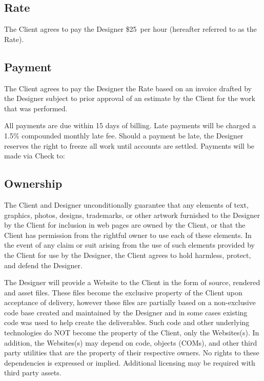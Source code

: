 \documentclass[a4paper,12pt]{article} %
\newcommand{\HourlyRate}{\$25}
\begin{document}
\subsection{Rate}

The Client agrees to pay the Designer \HourlyRate~per hour (hereafter referred to as the Rate).


\subsection{Payment}

The Client agrees to pay the Designer the Rate based on an invoice drafted by the Designer subject to prior approval of an estimate by the Client for the work that was performed.

All payments are due within 15 days of billing. Late payments will be charged a 1.5\% compounded monthly late fee. Should a payment be late, the Designer reserves the right to freeze all work until accounts are settled. Payments will be made via Check to:


\subsection{Ownership}

The Client and Designer unconditionally guarantee that any elements of text, graphics, photos, designs, trademarks, or other artwork furnished to the Designer by the Client for inclusion in web pages are owned by the Client, or that the Client has permission from the rightful owner to use each of these elements. In the event of any claim or suit arising from the use of such elements provided by the Client for use by the Designer, the Client agrees to hold harmless, protect, and defend the Designer.

The Designer will provide a Website to the Client in the form of source, rendered and asset files. These files become the exclusive property of the Client upon acceptance of delivery, however these files are partially based on a non-exclusive code base created and maintained by the Designer and in some cases existing code was used to help create the deliverables. Such code and other underlying technologies do NOT become the property of the Client, only the Websites(s). In addition, the Websites(s) may depend on code, objects (COMs), and other third party utilities that are the property of their respective owners. No rights to these dependencies is expressed or implied. Additional licensing may be required with third party assets.
\end{document}
